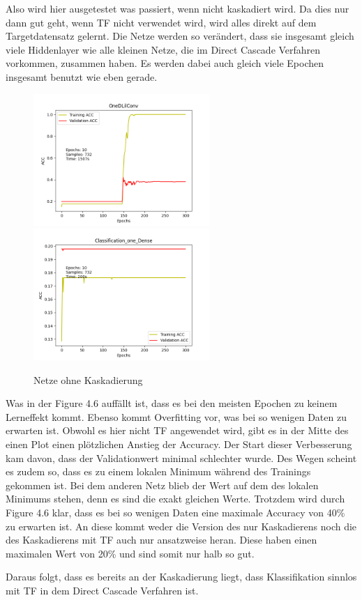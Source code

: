 Also wird hier ausgetestet was passiert, wenn nicht kaskadiert wird. Da dies nur dann gut geht, wenn TF nicht verwendet wird, wird alles direkt 
auf dem Targetdatensatz gelernt. Die Netze werden so verändert, dass sie insgesamt gleich viele Hiddenlayer wie alle kleinen Netze, die im 
Direct Cascade Verfahren vorkommen, zusammen haben. Es werden dabei auch gleich viele Epochen insgesamt benutzt wie eben gerade. 

\begin{figure}[htpb]
    \includegraphics[height=5cm]{../../Plots/ba_plots/classnocascade/1dc.png}
    \includegraphics[height=5cm]{../../Plots/ba_plots/classnocascade/cod.png}
    \caption{\label{fig:nocascade} Netze ohne Kaskadierung}
\end{figure}


Was in der Figure 4.6 auffällt ist, dass es bei den meisten Epochen zu keinem Lerneffekt kommt. Ebenso kommt Overfitting vor, was bei so wenigen 
Daten zu erwarten ist. Obwohl es hier nicht TF angewendet wird, gibt es in der Mitte des einen Plot einen plötzlichen Anstieg der Accuracy. 
Der Start dieser Verbesserung kam davon, dass der Validationwert minimal schlechter wurde. Des Wegen 
scheint es zudem so, dass es zu einem lokalen Minimum während des Trainings gekommen ist. Bei dem anderen Netz blieb der Wert auf dem des 
lokalen Minimums stehen, denn es sind die exakt gleichen Werte. Trotzdem wird durch Figure 4.6 klar, dass es bei so wenigen Daten eine maximale 
Accuracy von 40\% zu erwarten ist. An diese kommt weder die Version des nur Kaskadierens noch die des Kaskadierens mit TF auch nur 
ansatzweise heran. Diese haben einen maximalen Wert von 20\% und sind somit nur halb so gut. 

Daraus folgt, dass es bereits an der Kaskadierung liegt, dass Klassifikation sinnlos mit TF in dem Direct Cascade Verfahren ist. 
